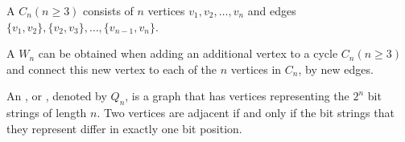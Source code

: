             \par A  $C_{n} (n \geq 3)$ consists of $n$ vertices $v_{1}, v_{2}, \ldots, v_{n}$
            and edges $\{v_{1}, v_{2}\}, \{v_{2}, v_{3}\}, \ldots, \{v_{n-1}, v_{n}\}$.

            \par A  $W_{n}$ can be obtained when adding an additional vertex to a cycle
            $C_{n} (n \geq 3)$ and connect this new vertex to each of the $n$ vertices in $C_{n}$, by
            new edges.

            \par An , or , denoted by $Q_{n}$, is a
            graph that has vertices representing the $2^{n}$ bit strings of length $n$. Two
            vertices are adjacent if and only if the bit strings that they represent differ in
            exactly one bit position.
    \hiiEND

